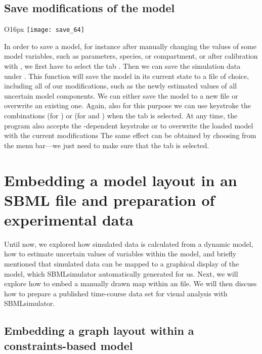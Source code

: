 \section{Save modifications of the model}
\label{ch:savesim}
\begin{wrapfigure}{O}{16px}
\vspace{\wrapfigspace}
\texttt{[image: save\_64]}
\end{wrapfigure}
In order to save a model, for instance after manually changing the values of some model variables, such as parameters, species, or compartment, or after calibration with \EvA, we first have to select the tab .
Then we can save the simulation data under .
This function will save the model in its current state to a file of choice, including all of our modifications, such as the newly estimated values of all uncertain model components.
We can either save the model to a new file or overwrite an existing one.
Again, also for this purpose we can use keystroke the combinations  (for \MacOSX) or  (for \Linux and \Windows) when the  tab is selected.
At any time, the program also accepts the \OS-dependent keystroke  or  to overwrite the loaded model with the current modifications
The same effect can be obtained by choosing  from the menu bar---we just need to make sure that the tab  is selected.



\chapter{Embedding a model layout in an SBML file and preparation of experimental data}
\label{chap:EmbeddingLayoutsInModels}

Until now, we explored how simulated data is calculated from a dynamic model, how to estimate uncertain values of variables within the model, and briefly mentioned that simulated data can be mapped to a graphical display of the model, which SBMLsimulator automatically generated for us.
Next, we will explore how to embed a manually drawn map within an \SBML file.
We will then discuss how to prepare a published time-course data set for visual analysis with SBMLsimulator.

\section{Embedding a graph layout within a constraints-based model}

